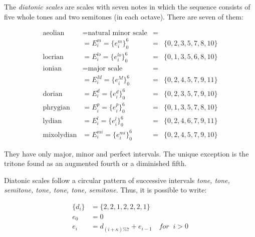 The \emph{diatonic scales} are scales with seven notes in which the sequence consists of five whole tones and two semitones (in each octave). There are seven of them:

\begin{equation}\label{eq:escalas}
\begin{aligned}
	\text{aeolian}    & = \text{natural minor scale}  & = & \\
			  & = E_i^m = \{e_i^m\}_0^6       & = & \{0,2,3,5,7,8,10\} \\
	\text{locrian}    & = E_i^{lo} = \{e_i^{lo}\}_0^6 & = & \{0,1,3,5,6,8,10\} \\ 
	\text{ionian}     & = \text{major scale}          & = &  \\
			  & = E_i^M = \{e_i^M\}_0^6       & = & \{0,2,4,5,7,9,11\} \\
	\text{dorian}     & = E_i^{d} = \{e_i^{d}\}_0^6   & = & \{0,2,3,5,7,9,10\} \\
	\text{phrygian}   & = E_i^{p} = \{e_i^{p}\}_0^6   & = & \{0,1,3,5,7,8,10\} \\
	\text{lydian}     & = E_i^{l}=\{e_i^{l}\}_0^6     & = & \{0,2,4,6,7,9,11\} \\
	\text{mixolydian} & = E_i^{mi} = \{e_i^{mi}\}_0^6 & = & \{0,2,4,5,7,9,10\}
\end{aligned}
\end{equation}

\noindent They have only major, minor and perfect intervals.
The unique exception is the tritone found as an augmented fourth or a diminished fifth.

Diatonic scales follow a circular pattern of successive intervals \textit{tone, tone, semitone, tone, tone, tone, semitone}. Thus, it is possible to write:

\begin{equation}\label{eq:relacaoDia}
\begin{split}
\{d_i\} & =\{2,2,1,2,2,2,1\} \\
e_0 & =0 \\
e_i & =d_{(i+\kappa)\%7}+e_{i-1} \quad for \;\;  i > 0
\end{split}
\end{equation}

